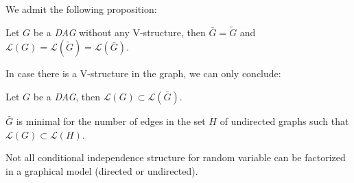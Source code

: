 \documentclass[12pt]{report}
\begin{document}
We admit the following proposition:
\begin{proposition}
	Let $G$ be a \emph{DAG} without any V-structure, then $\bar{G} = \tilde{G}$ and $\mathcal{L}(G)=\mathcal{L}(\tilde{G})=\mathcal{L}(\bar{G}).$
\end{proposition}
In case there is a V-structure in the graph, we can only conclude:
\begin{proposition}
	Let $G$ be a \emph{DAG}, then $\mathcal{L}(G) \subset \mathcal{L}(\bar{G})$.
\end{proposition}
$\bar{G}$ is minimal for the number of edges in the set $H$ of undirected graphs such that $\mathcal{L}(G)\subset\mathcal{L}(H)$.
\begin{danger} Not all conditional independence structure for random variable can be factorized in a graphical model (directed or undirected).
\end{danger}
\end{document}
